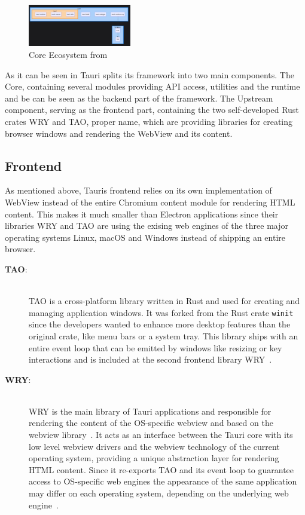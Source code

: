 \begin{figure}[ht]
    \centering
    \includegraphics[width=0.4\textwidth]{images/TauriCore}
    \caption{Core Ecosystem from~\cite{tauri}}
    \label{fig:tauri:core}
\end{figure}
As it can be seen in  Tauri splits its framework into two main components.
The Core, containing several modules providing \ac{API} access, utilities and the runtime and be can be seen as the backend part of the framework.
The Upstream component, serving as the frontend part, containing the two self-developed Rust crates \ac{WRY} and TAO, proper name, which are providing libraries for creating browser windows and rendering the WebView and its content.

\subsection{Frontend}
\label{subsec:tauri:frontend}
As mentioned above, Tauris frontend relies on its own implementation of WebView instead of the entire Chromium content module for rendering \ac{HTML} content.
This makes it much smaller than Electron applications since their libraries \ac{WRY} and TAO are using the exising web engines of the three major operating systems Linux, macOS and Windows instead of shipping an entire browser.
\begin{description}
    \item[\textbf{TAO}:] \hfill \\
    TAO is a cross-platform library written in Rust and used for creating and managing application windows.
    It was forked from the Rust crate \texttt{winit} since the developers wanted to enhance more desktop features than the original crate, like menu bars or a system tray.
    This library ships with an entire event loop that can be emitted by windows like resizing or key interactions and is included at the second frontend library \ac{WRY}~\cite{TAO}\@.
    \item[\textbf{\ac{WRY}}:] \hfill \\
    \ac{WRY} is the main library of Tauri applications and responsible for rendering the content of the \ac{OS}-specific webview and based on the webview library~\cite{githubWebview}.
    It acts as an interface between the Tauri core with its low level webview drivers and the webview technology of the current operating system, providing a unique abstraction layer for rendering \ac{HTML} content.
    Since it re-exports TAO and its event loop to guarantee access to \ac{OS}-specific web engines the appearance of the same application may differ on each operating system, depending on the underlying web engine~\cite{WRY}.
\end{description}
